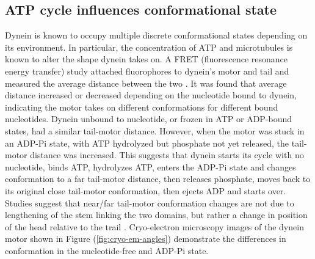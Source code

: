 \documentclass[
11pt, %
english, %
singlespacing, %
headsepline, %
chapterinoneline, %
]{MastersDoctoralThesis} %
\begin{document}
\subsection{ATP cycle influences conformational state}
Dynein is known to occupy multiple discrete conformational states depending on its environment. In particular, the concentration of ATP and microtubules is known to alter the shape dynein takes on. A FRET (fluorescence resonance energy transfer) study attached fluorophores to dynein's motor and tail and measured the average distance between the two \cite{FRETstatepaper}. It was found that average distance increased or decreased depending on the nucleotide bound to dynein, indicating the motor takes on different conformations for different bound nucleotides. Dynein unbound to nucleotide, or frozen in ATP or ADP-bound states, had a similar tail-motor distance. However, when the motor was stuck in an ADP-Pi state, with ATP hydrolyzed but phosphate not yet released, the tail-motor distance was increased. This suggests that dynein starts its cycle with no nucleotide, binds ATP, hydrolyzes ATP, enters the ADP-Pi state and changes conformation to a far tail-motor distance, then releases phosphate, moves back to its original close tail-motor conformation, then ejects ADP and starts over.\\

Studies suggest that near/far tail-motor conformation changes are not due to lengthening of the stem linking the two domains, but rather a change in position of the head relative to the trail \cite{FRETstatepaper} \cite{burgess-paper}. Cryo-electron microscopy images of the dynein motor shown in Figure (\ref{fig:cryo-em-angles}) demonstrate the differences in conformation in the nucleotide-free and ADP-Pi state.\\
\end{document}
